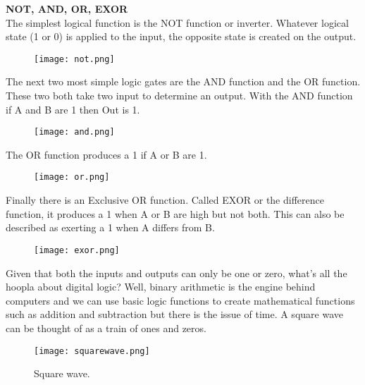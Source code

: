 \documentclass[12pt]{article}
\begin{document}
\begin{enumerate}[1.]
{\bf NOT, AND, OR, EXOR}\\
The simplest logical function is the NOT function or inverter. 
Whatever logical state (1 or 0) is applied to the input, the opposite state is created on the output.
\begin{figure}[!ht]
\begin{center}
\texttt{[image: not.png]}
\end{center}
\end{figure}
\par The next two most simple logic gates are the AND function and the OR function. 
These two both take two input to determine an output. 
With the AND function if A and B are 1 then Out is 1.
\begin{figure}[!ht]
\begin{center}
\texttt{[image: and.png]}
\end{center}
\end{figure}
\par The OR function produces a 1 if A or B are 1.
\begin{figure}[!ht]
\begin{center}
\texttt{[image: or.png]}
\end{center}
\end{figure}
\par Finally there is an Exclusive OR function. Called EXOR or the difference function, it produces a 1 when A or B are high but not both. This can also be described as exerting a 1 when A differs from B.
\begin{figure}[!ht]
\begin{center}
\texttt{[image: exor.png]}
\end{center}
\end{figure}
\pagebreak
\par Given that both the inputs and outputs can only be one or zero, what's all the hoopla about digital logic? 
Well, binary arithmetic is the engine behind computers and we can use basic logic functions to create mathematical functions such as addition and subtraction but there is the issue of time. 
A square wave can be thought of as a train of ones and zeros.
\begin{figure}[!ht]
\begin{center}
\texttt{[image: squarewave.png]}
\caption*{Square wave.}
\end{center}
\end{figure}


\end{enumerate}
\end{document}
